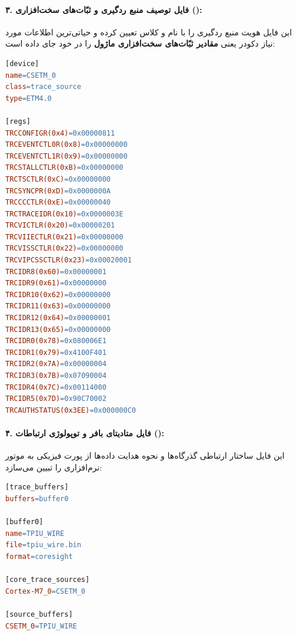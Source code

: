 \paragraph*{۳. فایل توصیف منبع ردگیری و ثبّات‌های سخت‌افزاری ():}
این فایل هویت منبع ردگیری را با نام  و کلاس  تعیین کرده و حیاتی‌ترین اطلاعات مورد نیاز دکودر یعنی \textbf{مقادیر ثبّات‌های سخت‌افزاری ماژول } را در خود جای داده است:
\begin{latin}
\begin{lstlisting}[language=make, caption={\rl{محتوای فایل منبع ردگیری و ثبّات‌های سخت‌افزاری} \lr{\texttt{device2.ini}}}]
[device]
name=CSETM_0
class=trace_source
type=ETM4.0

[regs]
TRCCONFIGR(0x4)=0x00000811
TRCEVENTCTL0R(0x8)=0x00000000
TRCEVENTCTL1R(0x9)=0x00000000
TRCSTALLCTLR(0xB)=0x00000000
TRCTSCTLR(0xC)=0x00000000
TRCSYNCPR(0xD)=0x0000000A
TRCCCCTLR(0xE)=0x00000040
TRCTRACEIDR(0x10)=0x0000003E
TRCVICTLR(0x20)=0x00000201
TRCVIIECTLR(0x21)=0x00000000
TRCVISSCTLR(0x22)=0x00000000
TRCVIPCSSCTLR(0x23)=0x00020001
TRCIDR8(0x60)=0x00000001
TRCIDR9(0x61)=0x00000000
TRCIDR10(0x62)=0x00000000
TRCIDR11(0x63)=0x00000000
TRCIDR12(0x64)=0x00000001
TRCIDR13(0x65)=0x00000000
TRCIDR0(0x78)=0x080006E1
TRCIDR1(0x79)=0x4100F401
TRCIDR2(0x7A)=0x00000004
TRCIDR3(0x7B)=0x07090004
TRCIDR4(0x7C)=0x00114000
TRCIDR5(0x7D)=0x90C70002
TRCAUTHSTATUS(0x3EE)=0x000000C0
\end{lstlisting}
\end{latin}

\paragraph*{۴. فایل متادیتای بافر و توپولوژی ارتباطات ():}
این فایل ساختار ارتباطی گذرگاه‌ها و نحوه هدایت داده‌ها از پورت فیزیکی به موتور نرم‌افزاری را تبیین می‌سازد:
\begin{latin}
\begin{lstlisting}[language=make, caption={\rl{محتوای فایل توپولوژی بافر} \lr{\texttt{trace.ini}}}]
[trace_buffers]
buffers=buffer0

[buffer0]
name=TPIU_WIRE
file=tpiu_wire.bin
format=coresight

[core_trace_sources]
Cortex-M7_0=CSETM_0

[source_buffers]
CSETM_0=TPIU_WIRE
\end{lstlisting}
\end{latin}

